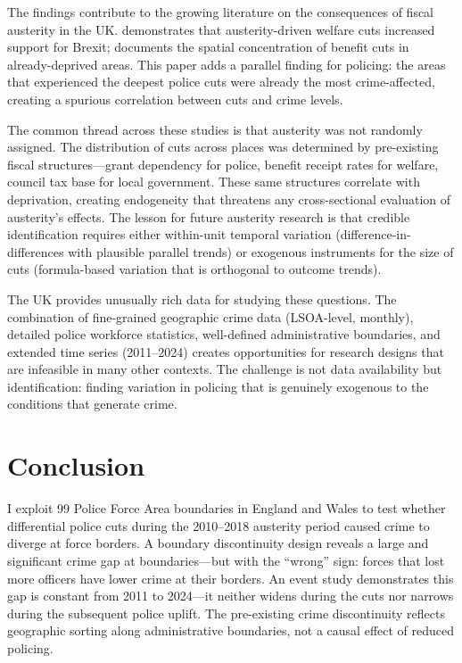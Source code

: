 \documentclass[12pt]{article}
\begin{document}
The findings contribute to the growing literature on the consequences of fiscal austerity in the UK. \citet{fetzer2019} demonstrates that austerity-driven welfare cuts increased support for Brexit; \citet{beatty2013} documents the spatial concentration of benefit cuts in already-deprived areas. This paper adds a parallel finding for policing: the areas that experienced the deepest police cuts were already the most crime-affected, creating a spurious correlation between cuts and crime levels.

The common thread across these studies is that austerity was not randomly assigned. The distribution of cuts across places was determined by pre-existing fiscal structures---grant dependency for police, benefit receipt rates for welfare, council tax base for local government. These same structures correlate with deprivation, creating endogeneity that threatens any cross-sectional evaluation of austerity's effects. The lesson for future austerity research is that credible identification requires either within-unit temporal variation (difference-in-differences with plausible parallel trends) or exogenous instruments for the size of cuts (formula-based variation that is orthogonal to outcome trends).

The UK provides unusually rich data for studying these questions. The combination of fine-grained geographic crime data (LSOA-level, monthly), detailed police workforce statistics, well-defined administrative boundaries, and extended time series (2011--2024) creates opportunities for research designs that are infeasible in many other contexts. The challenge is not data availability but identification: finding variation in policing that is genuinely exogenous to the conditions that generate crime.

\section{Conclusion}

I exploit 99 Police Force Area boundaries in England and Wales to test whether differential police cuts during the 2010--2018 austerity period caused crime to diverge at force borders. A boundary discontinuity design reveals a large and significant crime gap at boundaries---but with the ``wrong'' sign: forces that lost more officers have lower crime at their borders. An event study demonstrates this gap is constant from 2011 to 2024---it neither widens during the cuts nor narrows during the subsequent police uplift. The pre-existing crime discontinuity reflects geographic sorting along administrative boundaries, not a causal effect of reduced policing.
\end{document}
